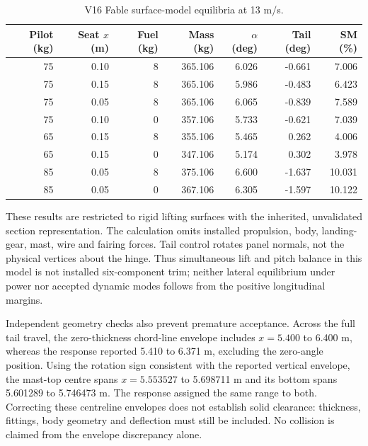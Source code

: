 \documentclass[10pt,letterpaper]{article}
\begin{document}
\begin{table}[htbp]
\centering\small
\caption{V16 Fable surface-model equilibria at 13 m/s.}
\label{tab:v16_cases}
\begin{tabular}{rrrrrrr}
\hline
Pilot (kg)&Seat $x$ (m)&Fuel (kg)&Mass (kg)&$\alpha$ (deg)&Tail (deg)&SM (\%)\\
\hline
75 & 0.10 & 8 & 365.106 & 6.026 & -0.661 & 7.006 \\
75 & 0.15 & 8 & 365.106 & 5.986 & -0.483 & 6.423 \\
75 & 0.05 & 8 & 365.106 & 6.065 & -0.839 & 7.589 \\
75 & 0.10 & 0 & 357.106 & 5.733 & -0.621 & 7.039 \\
65 & 0.15 & 8 & 355.106 & 5.465 & 0.262 & 4.006 \\
65 & 0.15 & 0 & 347.106 & 5.174 & 0.302 & 3.978 \\
85 & 0.05 & 8 & 375.106 & 6.600 & -1.637 & 10.031 \\
85 & 0.05 & 0 & 367.106 & 6.305 & -1.597 & 10.122 \\
\hline
\end{tabular}
\end{table}

These results are restricted to rigid lifting surfaces with the inherited,
unvalidated section representation. The calculation omits installed propulsion,
body, landing-gear, mast, wire and fairing forces. Tail control rotates panel normals,
not the physical vertices about the hinge. Thus simultaneous lift and pitch balance
in this model is not installed six-component trim; neither lateral equilibrium under
power nor accepted dynamic modes follows from the positive longitudinal margins.

Independent geometry checks also prevent premature acceptance. Across the full
tail travel, the zero-thickness chord-line envelope includes $x=5.400$ to 6.400 m,
whereas the response reported 5.410 to 6.371 m, excluding the zero-angle position.
Using the rotation sign consistent with the reported vertical envelope, the mast-top
centre spans $x=5.553527$ to 5.698711 m and its bottom spans 5.601289 to 5.746473 m.
The response assigned the same range to both. Correcting these centreline envelopes
does not establish solid clearance: thickness, fittings, body geometry and deflection
must still be included. No collision is claimed from the envelope discrepancy alone.
\end{document}
